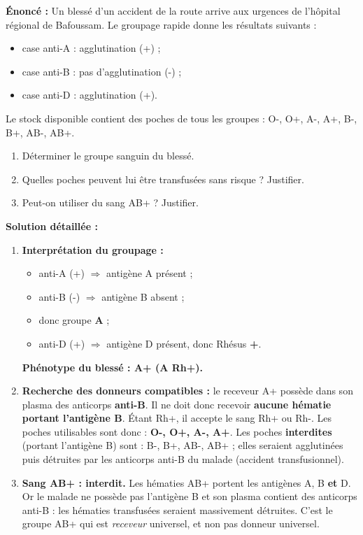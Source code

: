 \documentclass[11pt]{article}
\begin{document}
\begin{exoresolu}
\textbf{Énoncé :} Un blessé d'un accident de la route arrive aux urgences de l'hôpital régional de Bafoussam. Le groupage rapide donne les résultats suivants :
\begin{itemize}
    \item case anti-A : agglutination (+) ;
    \item case anti-B : pas d'agglutination (-) ;
    \item case anti-D : agglutination (+).
\end{itemize}
Le stock disponible contient des poches de tous les groupes : O-, O+, A-, A+, B-, B+, AB-, AB+.
\begin{enumerate}
    \item Déterminer le groupe sanguin du blessé.
    \item Quelles poches peuvent lui être transfusées sans risque ? Justifier.
    \item Peut-on utiliser du sang AB+ ? Justifier.
\end{enumerate}
\tcblower
\textbf{Solution détaillée :}
\begin{enumerate}
    \item \textbf{Interprétation du groupage :}
        \begin{itemize}
            \item anti-A (+) $\Rightarrow$ antigène A présent ;
            \item anti-B (-) $\Rightarrow$ antigène B absent ;
            \item donc groupe \textbf{A} ;
            \item anti-D (+) $\Rightarrow$ antigène D présent, donc Rhésus \textbf{+}.
        \end{itemize}
        \textbf{Phénotype du blessé : A+ (A Rh+).}
    \item \textbf{Recherche des donneurs compatibles :} le receveur A+ possède dans son plasma des anticorps \textbf{anti-B}. Il ne doit donc recevoir \textbf{aucune hématie portant l'antigène B}. Étant Rh+, il accepte le sang Rh+ ou Rh-.
        Les poches utilisables sont donc : \textbf{O-, O+, A-, A+}.
        Les poches \textbf{interdites} (portant l'antigène B) sont : B-, B+, AB-, AB+ ; elles seraient agglutinées puis détruites par les anticorps anti-B du malade (accident transfusionnel).
    \item \textbf{Sang AB+ : interdit.} Les hématies AB+ portent les antigènes A, B \textbf{et} D. Or le malade ne possède pas l'antigène B et son plasma contient des anticorps anti-B : les hématies transfusées seraient massivement détruites. C'est le groupe AB+ qui est \emph{receveur} universel, et non pas donneur universel.
\end{enumerate}
\end{exoresolu}
\end{document}
